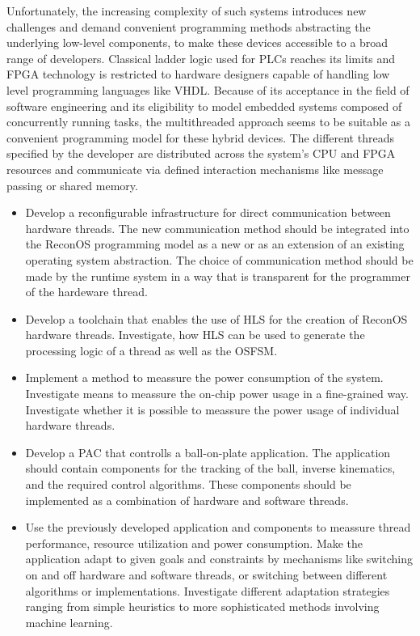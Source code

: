 Unfortunately, the increasing complexity of such systems introduces new
challenges and demand convenient programming methods abstracting the
underlying low-level components, to make these devices accessible to a broad
range of developers. Classical ladder logic used for \acp{PLC} reaches its
limits and \ac{FPGA} technology is restricted to hardware designers capable of
handling low level programming languages like \ac{VHDL}. Because of its
acceptance in the field of software engineering and its eligibility to model
embedded systems composed of concurrently running tasks, the multithreaded
approach seems to be suitable as a convenient programming model for these
hybrid devices. The different threads specified by the developer are
distributed across the system's \ac{CPU} and \ac{FPGA} resources and
communicate via defined interaction mechanisms like message passing or shared
memory.
\begin{itemize}
\item Develop a reconfigurable infrastructure for direct communication
between hardware threads. The new communication method should be integrated
into the ReconOS programming model as a new or as an extension of an existing
operating system abstraction. The choice of communication method should be
made by the runtime system in a way that is transparent for the programmer of
the hardeware thread.
\item Develop a toolchain that enables the use of \ac{HLS} for the creation of
ReconOS hardware threads. Investigate, how \ac{HLS} can be used to generate
the processing logic of a thread as well as the \ac{OSFSM}.
\item Implement a method to meassure the power consumption of the system.
Investigate means to meassure the on-chip power usage in a fine-grained way.
Investigate whether it is possible to meassure the power usage of individual
hardware threads.
\item Develop a \ac{PAC} that controlls a ball-on-plate application. The
application should contain components for the tracking of the ball, inverse
kinematics, and the required control algorithms. These components should be
implemented as a combination of hardware and software threads.
\item Use the previously developed application and components to meassure
thread performance, resource utilization and power consumption. Make the
application adapt to given goals and constraints by mechanisms like switching
on and off hardware and software threads, or switching between different
algorithms or implementations. Investigate different adaptation strategies
ranging from simple heuristics to more sophisticated methods involving machine
learning.
\end{itemize}